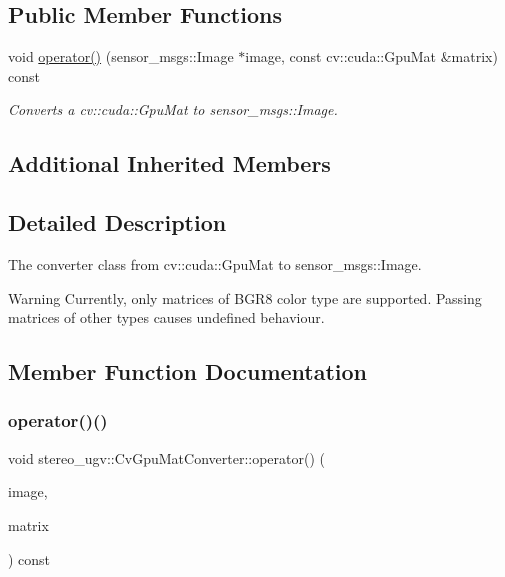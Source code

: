 \subsection*{Public Member Functions}
\begin{DoxyCompactItemize}
\item 
void \hyperlink{classstereo__ugv_1_1CvGpuMatConverter_a79ac0bdfd78942c8a2bf49cd56b8e177}{operator()} (sensor\+\_\+msgs\+::\+Image $\ast$image, const cv\+::cuda\+::\+Gpu\+Mat \&matrix) const
\begin{DoxyCompactList}\small\item\em Converts a cv\+::cuda\+::\+Gpu\+Mat to sensor\+\_\+msgs\+::\+Image. \end{DoxyCompactList}\end{DoxyCompactItemize}
\subsection*{Additional Inherited Members}


\subsection{Detailed Description}
The converter class from cv\+::cuda\+::\+Gpu\+Mat to sensor\+\_\+msgs\+::\+Image. 

\begin{DoxyWarning}{Warning}
Currently, only matrices of B\+G\+R8 color type are supported. Passing matrices of other types causes undefined behaviour. 
\end{DoxyWarning}


\subsection{Member Function Documentation}
\mbox{\label{classstereo__ugv_1_1CvGpuMatConverter_a79ac0bdfd78942c8a2bf49cd56b8e177}} 
\subsubsection{\texorpdfstring{operator()()}{operator()()}}
{\footnotesize\ttfamily void stereo\+\_\+ugv\+::\+Cv\+Gpu\+Mat\+Converter\+::operator() (\begin{DoxyParamCaption}\item[{sensor\+\_\+msgs\+::\+Image $\ast$}]{image,  }\item[{const cv\+::cuda\+::\+Gpu\+Mat \&}]{matrix }\end{DoxyParamCaption}) const}



